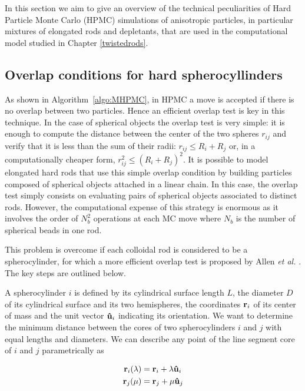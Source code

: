 In this section we aim to give an overview of the technical peculiarities of Hard Particle Monte Carlo (HPMC) simulations of anisotropic particles, in particular mixtures of elongated rods and depletants, that are used in the computational model studied in Chapter \ref{twistedrods}.

\subsection{Overlap conditions for hard spherocyllinders}

As shown in Algorithm~\ref{algo:MHPMC}, in HPMC a move is accepted if there is no overlap between two particles. Hence an efficient overlap test is key in this technique. In the case of spherical objects the overlap test is very simple: it is enough to compute the distance between the center of the two spheres $r_{ij}$ and verify that it is less than the sum of their radii: $r_{ij} \leqslant R_i + R_j$ or, in a computationally cheaper form, $r_{ij}^2 \leqslant (R_i + R_j)^2$. It is possible to model elongated hard rods that use this simple overlap condition by building particles composed of spherical objects attached in a linear chain. In this case, the overlap test simply consists on evaluating pairs of spherical objects associated to distinct rods. However, the computational expense of this strategy is enormous as it involves the order of $N_b^2$ operations at each MC move where $N_b$ is the number of spherical beads in one rod.

This problem is overcome if each colloidal rod is considered to be a spherocylinder, for which a more efficient overlap test is proposed by Allen {\em et al.} \cite{allenevans93}. The key steps are outlined below.

A spherocylinder $i$ is defined by its cylindrical surface length $L$, the diameter $D$ of its cylindrical surface and its two hemispheres, the coordinates ${\bf r}_i$ of its center of mass and the unit vector ${\bf \hat{u}}_i$ indicating its orientation. We want to determine the minimum distance between the cores of two spherocylinders $i$ and $j$ with equal lengths and diameters. We can describe any point of the line segment core of $i$ and $j$ parametrically as

\begin{align}
{\bf r}_i(\lambda) &= {\bf r}_i + \lambda {\bf \hat{u}}_i \nonumber \\
{\bf r}_j(\mu) &= {\bf r}_j + \mu {\bf \hat{u}}_j
\end{align}

